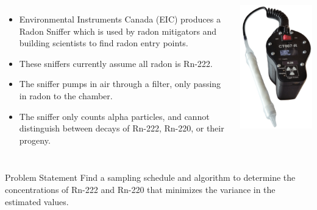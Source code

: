 \documentclass{beamer}
\begin{document}
\begin{frame}{}

\begin{columns}


\begin{itemize}
\item Environmental Instruments Canada (EIC) produces a Radon Sniffer which is used by radon mitigators and building scientists to find radon entry points.
\item These sniffers currently assume all radon is Rn-222.
\item The sniffer pumps in air through a filter, only passing in radon to the chamber.
\item The sniffer only counts alpha particles, and cannot distinguish between decays of Rn-222, Rn-220, or their progeny.
\end{itemize}

\includegraphics[scale=0.4]{images/CT007R.png}
\end{columns}


\end{frame}
\begin{frame}{Problem Statement}
    Find a sampling schedule and algorithm to determine the concentrations of Rn-222 and Rn-220 that minimizes the variance in the estimated values.
\end{frame}
\end{document}
